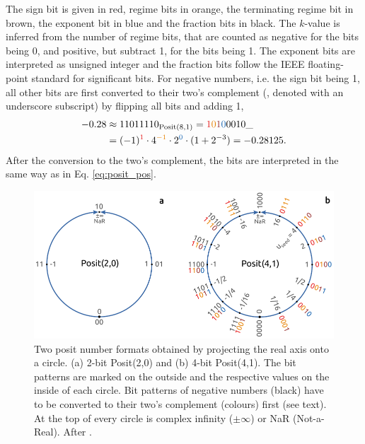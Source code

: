 \documentclass[draft]{agujournal2019}
\newcommand{\op}{\operatorname}
\begin{document}
The sign bit is given in red, regime bits in orange, the terminating regime bit in brown, the exponent bit in blue and the fraction bits in black. The $k$-value is inferred from the number of regime bits, that are counted as negative for the bits being 0, and positive, but subtract 1, for the bits being 1. The exponent bits are interpreted as unsigned integer and the fraction bits follow the IEEE floating-point standard for significant bits. For negative numbers, i.e. the sign bit being 1, all other bits are first converted to their two's complement (, denoted with an underscore subscript) by flipping all bits and adding 1,
\begin{equation}
\begin{split}
-0.28 &  \approx 11011110_{\op{Posit}(8,1)} = {\color{psign}1}{\color{pregime}0}{\color{pregimet}1}{\color{pexpo}0}0010\_ \\
& = (-1)^{\color{psign}1} \cdot 4^{\color{pregime}-1} \cdot 2^{\color{pexpo}0} \cdot (1+2^{-3}) = -0.28125.
\end{split}
\label{eq:2comp}
\end{equation}
After the conversion to the two's complement, the bits are interpreted in the same way as in Eq. \ref{eq:posit_pos}.

\begin{figure}[htbp]
\center
\includegraphics[width=1\textwidth]{circles.pdf}
\caption{Two posit number formats obtained by projecting the real axis onto a circle. (a) 2-bit Posit(2,0) and (b) 4-bit Posit(4,1). The bit patterns are marked on the outside and the respective values on the inside of each circle. Bit patterns of negative numbers (black) have to be converted to their two's complement (colours) first (see text). At the top of every circle is complex infinity ($\pm \infty$) or NaR (Not-a-Real). After . }
\label{fig:circle}
\end{figure}
\end{document}
